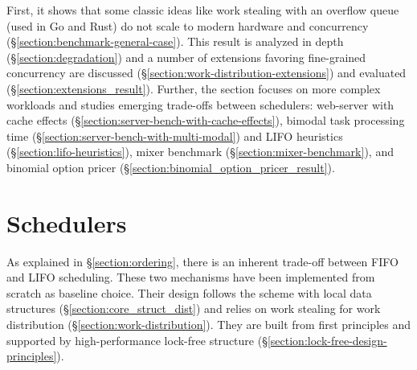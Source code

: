 \documentclass[12pt,a4paper,twoside]{report}
\begin{document}
First, it shows that some classic ideas like work stealing with an overflow queue (used in Go and Rust) do not scale to modern hardware and concurrency (\S\ref{section:benchmark-general-case}). This result is analyzed in depth (\S\ref{section:degradation}) and a number of extensions favoring fine-grained concurrency are discussed (\S\ref{section:work-distribution-extensions}) and evaluated (\S\ref{section:extensions_result}). Further, the section focuses on more complex workloads and studies emerging trade-offs between schedulers: web-server with cache effects (\S\ref{section:server-bench-with-cache-effects}), bimodal task processing time (\S\ref{section:server-bench-with-multi-modal}) and LIFO heuristics (\S\ref{section:lifo-heuristics}), mixer benchmark (\S\ref{section:mixer-benchmark}), and binomial option pricer (\S\ref{section:binomial_option_pricer_result}).

\section{Schedulers}
\label{section:impl-schedulers}
As explained in \S\ref{section:ordering}, there is an inherent trade-off between FIFO and LIFO scheduling. These two mechanisms have been implemented from scratch as baseline choice. Their design follows the scheme with local data structures (\S\ref{section:core_struct_dist}) and relies on work stealing for work distribution (\S\ref{section:work-distribution}). They are built from first principles and supported by high-performance lock-free structure (\S\ref{section:lock-free-design-principles}). 
\end{document}
